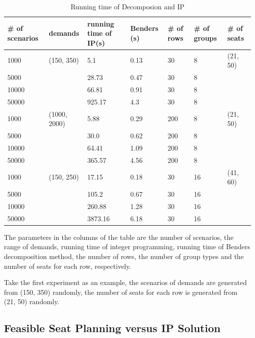 \begin{table}[ht]
  \centering
  \caption{Running time of Decomposion and IP}\label{tab_1}
  \begin{tabular}{|l|l|l|l|l|l|l|}
  \hline
  \# of scenarios & demands & running time of IP(s) & Benders (s) & \# of rows & \# of groups & \# of seats\\
  \hline
  1000  & (150, 350) & 5.1  & 0.13 & 30 & 8 & (21, 50)\\
  5000  & & 28.73 & 0.47 & 30 & 8 \\
  10000 & & 66.81  & 0.91 & 30 & 8 \\
  50000 & & 925.17 & 4.3 & 30 & 8 \\
  \hline
  1000  & (1000, 2000) & 5.88 & 0.29 & 200 & 8 & (21, 50)\\
  5000  & & 30.0 & 0.62 & 200 & 8 \\
  10000 & & 64.41 & 1.09 & 200 & 8 \\
  50000 & & 365.57 & 4.56 & 200 & 8 \\
  \hline
  1000  & (150, 250) & 17.15  & 0.18 & 30 & 16 & (41, 60) \\
  5000  & & 105.2  & 0.67 & 30 & 16  \\
  10000 & & 260.88 & 1.28 & 30 & 16  \\
  50000 & & 3873.16 & 6.18 & 30 & 16  \\
  \hline
  \end{tabular}
\end{table}

The parameters in the columns of the table are the number of scenarios, the range of demands, running time of integer programming, running time of Benders decomposition method, the number of rows, the number of group types and the number of seats for each row, respectively. 

Take the first experiment as an example, the scenarios of demands are generated from (150, 350) randomly, the number of seats for each row is generated from (21, 50) randomly.




\subsection{Feasible Seat Planning versus IP Solution}

